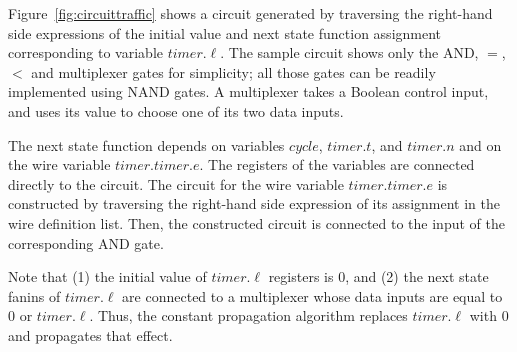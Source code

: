 %

\begin{example}
Figure~\ref{fig:circuittraffic} shows a circuit generated 
by traversing the right-hand side expressions of the initial 
value and next state function assignment corresponding to variable
$timer.\ell$. 
The sample circuit shows only the AND, $=$, $<$ and multiplexer gates for simplicity; 
all those gates can be readily implemented using NAND gates. 
A multiplexer takes a Boolean control input, and uses its value to 
choose one of its two data inputs. 

The next state function depends on variables $cycle$, $timer.t$, and $timer.n$ and on 
the wire variable $timer.timer.e$. 
The registers of the variables are connected directly to the circuit. 
The circuit for the wire variable $timer.timer.e$ is constructed by traversing 
the right-hand side expression of its 
assignment in the wire definition list. 
Then, the constructed circuit is connected to the input of the corresponding AND gate. 

Note that (1) the initial value of $timer.\ell$ registers is $0$, and  (2) the next state fanins of $timer.\ell$ are connected to a multiplexer whose data inputs are equal to $0$ or $timer.\ell$. Thus, the constant propagation algorithm replaces $timer.\ell$ with $0$ and propagates that effect. 

\end{example}
